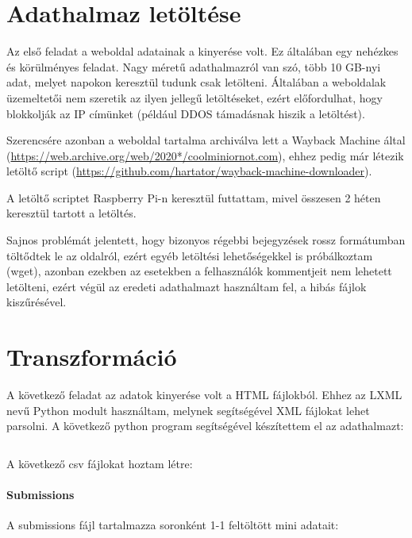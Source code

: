 \documentclass[14pt,a4paper]{article}
\begin{document}
\section{Adathalmaz letöltése}

Az első feladat a weboldal adatainak a kinyerése volt. Ez általában egy nehézkes és körülményes feladat. Nagy
méretű adathalmazról van szó, több 10 GB-nyi adat, melyet napokon keresztül tudunk csak letölteni. Általában a
weboldalak üzemeltetői nem szeretik az ilyen jellegű letöltéseket, ezért előfordulhat, hogy blokkolják az IP
címünket (például DDOS támadásnak hiszik a letöltést).

Szerencsére azonban a weboldal tartalma archiválva lett a Wayback Machine által
(\href{https://web.archive.org/web/2020*/coolminiornot.com}{\url{https://web.archive.org/web/2020*/coolminiornot.com}}),
ehhez pedig már létezik letöltő script
(\href{https://github.com/hartator/wayback-machine-downloader}{\url{https://github.com/hartator/wayback-machine-downloader}}).

A letöltő scriptet Raspberry Pi-n keresztül futtattam, mivel összesen 2 héten keresztül tartott a letöltés.

Sajnos problémát jelentett, hogy bizonyos régebbi bejegyzések rossz formátumban töltődtek le az oldalról, ezért egyéb
letöltési lehetőségekkel is próbálkoztam (wget), azonban ezekben az esetekben a felhasználók kommentjeit nem lehetett
letölteni, ezért végül az eredeti adathalmazt használtam fel, a hibás fájlok kiszűrésével.

\section{Transzformáció}

A következő feladat az adatok kinyerése volt a HTML fájlokból. Ehhez az LXML nevű Python modult használtam, melynek
segítségével XML fájlokat lehet parsolni. A következő python program segítségével készítettem el az adathalmazt:

\inputminted[linenos, breaklines, fontsize=\footnotesize]{python}{../python/process.py}

A következő csv fájlokat hoztam létre:

\paragraph{Submissions}

A submissions fájl tartalmazza soronként 1-1 feltöltött mini adatait:
\end{document}
